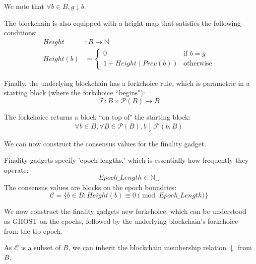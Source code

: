 \begin{defn}
We note that $\forall b \in B, g \downharpoonright b$.

The blockchain is also equipped with a height map that satisfies the following conditions:
\begin{align*}
  Height&: B \to \mathbb{N} \\
  Height(b) &= \begin{cases}
    \text{$0$} &\text{if $b = g$} \\
    \text{$1 + Height(Prev(b))$} &\text{otherwise}
  \end{cases}
\end{align*}

Finally, the underlying blockchain has a forkchoice rule, which is parametric in a starting block (where the forkchoice ``begins"):
$$
\mathcal{F}: B \times \mathcal{P}(B) \to B
$$

The forkchoice returns a block ``on top of" the starting block:
$$
\forall b \in B, \forall \underline{B} \in \mathcal{P}(B), b \downharpoonright \mathcal{F}(b, \underline{B})
$$
\end{defn}

We can now construct the consensus values for the finality gadget.
\begin{defn}
Finality gadgets specify 'epoch lengths,' which is essentially how frequently they operate:
$$
Epoch\_Length \in \mathbb{N}_+
$$
The consensus values are blocks on the epoch boundries:
$$
\mathcal{C} = \{b \in B : Height(b) \equiv 0 \pmod{Epoch\_Length}\}
$$
\end{defn}

We now construct the finality gadgets new forkchoice, which can be understood as GHOST on the epochs, followed by the underlying blockchain's forkchoice from the tip epoch.

As $\mathcal{C}$ is a subset of $B$, we can inherit the blockchain membership relation $\downharpoonright$ from $B$.

